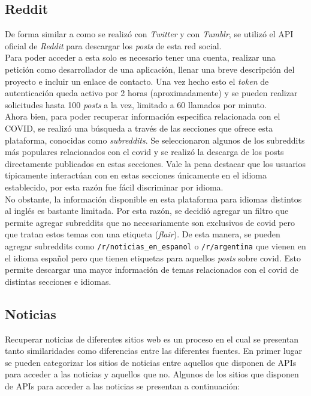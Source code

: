 \subsection{Reddit}

De forma similar a como se realizó con \textit{Twitter} y con \textit{Tumblr}, se utilizó el API oficial de \textit{Reddit} \cite{RedditDoc} para descargar los \textit{posts} de esta red social. \\

Para poder acceder a esta solo es necesario tener una cuenta, realizar una petición como desarrollador de una aplicación, llenar una breve descripción del proyecto e incluir un enlace de contacto. Una vez hecho esto el \textit{token} de autenticación queda activo por 2 horas (aproximadamente) y se pueden realizar solicitudes hasta 100 \textit{posts} a la vez, limitado a 60 llamados por minuto. \\

Ahora bien, para poder recuperar información especifica relacionada con el COVID, se realizó una búsqueda a través de las secciones que ofrece esta plataforma, conocidas como \textit{subreddits}. Se seleccionaron algunos de los subreddits más populares relacionados con el covid y se realizó la descarga de los posts directamente publicados en estas secciones. Vale la pena destacar que los usuarios típicamente interactúan con en estas secciones únicamente en el idioma establecido, por esta razón fue fácil discriminar por idioma.\\

No obstante, la información disponible en esta plataforma para idiomas distintos al inglés es bastante limitada. Por esta razón, se decidió agregar un filtro que permite agregar subreddits que no necesariamente son exclusivos de covid pero que tratan estos temas con una etiqueta (\textit{flair}). De esta manera, se pueden agregar subreddits como \texttt{/r/noticias\_en\_espanol} o \texttt{/r/argentina} que vienen en el idioma español pero que tienen etiquetas para aquellos \textit{posts} sobre covid. Esto permite descargar una mayor información de temas relacionados con el covid de distintas secciones e idiomas.

\subsection{Noticias}
Recuperar noticias de diferentes sitios web es un proceso en el cual se presentan tanto similaridades como diferencias entre las diferentes fuentes. En primer lugar se pueden categorizar los sitios de noticias entre aquellos que disponen de APIs para acceder a las noticias y aquellos que no. Algunos de los sitios que disponen de APIs para acceder a las noticias se presentan a continuación:

